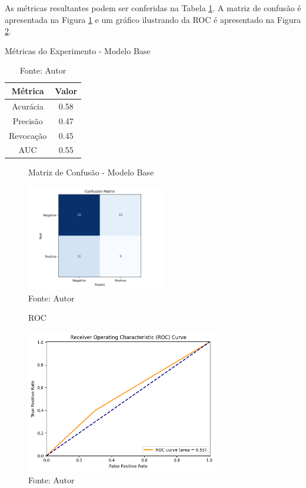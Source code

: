 As métricas resultantes podem ser conferidas na Tabela \ref{tab:metrics}. A matriz de confusão é apresentada na Figura \ref{fig:fig016} e um gráfico ilustrando da \gls{ROC} é apresentado na Figura \ref{fig:fig017}.
\newline

\begin{table}[h!]
    \centering
    \caption{Métricas do Experimento - Modelo Base}
    \renewcommand{\arraystretch}{1} %
    \begin{tabular}{|c|c|}
    \hline 
          \textbf{Métrica} & \textbf{Valor} \\ 
    \hline 
        Acurácia & 0.58 \\ 
    \hline 
        Precisão & 0.47 \\ 
    \hline 
        Revocação & 0.45 \\ 
    \hline 
        AUC & 0.55 \\ 
    \hline 
    \end{tabular} 
    \caption*{Fonte: Autor}
    \label{tab:metrics}
\end{table}

\begin{figure}[h!]
    \centering
    \caption{Matriz de Confusão -  Modelo Base}
    \includegraphics[width=0.55\textwidth]{figures/fig016.png}
    \caption*{Fonte: Autor}
    \label{fig:fig016}
\end{figure}

\begin{figure}[h!]
    \centering
    \caption{ROC}
    \includegraphics[width=0.75\textwidth]{figures/fig017.png}
    \caption*{Fonte: Autor}
    \label{fig:fig017}
\end{figure}


